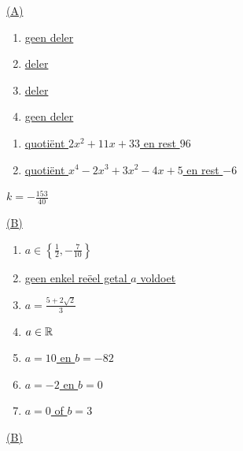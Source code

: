 \documentclass{ximera}
\begin{document}
\begin{oplossing} 
\hyperlink{oef3.2}{(A)}
\end{oplossing} 

\begin{oplossing} 
\begin{enumerate}
\item
\hyperlink{oef3.3}{geen deler}
\item
\hyperlink{oef3.3}{deler}
\item
\hyperlink{oef3.3}{deler}
\item
\hyperlink{oef3.3}{geen deler}
\end{enumerate}
\end{oplossing} 

\begin{oplossing} 
\begin{enumerate}
\item
\hyperlink{oef3.4}{quoti\"ent $2x^2+11x+33$ en rest $96$}
\item
\hyperlink{oef3.4}{quoti\"ent $x^4-2x^3+3x^2-4x+5$ en rest $-6$}
\end{enumerate}
\end{oplossing} 

\begin{oplossing} 
\hyperlink{oef3.5}{$k = - \frac{153}{40}$}
\end{oplossing} 

\begin{oplossing} 
\hyperlink{oef3.6}{(B)}
\end{oplossing} 

\begin{oplossing} 
\begin{enumerate}
\item
\hyperlink{oef3.7}{$a \in \left\{\frac{1}{2}, -\frac{7}{10}\right\}$}
\item
\hyperlink{oef3.7}{geen enkel re\"eel getal $a$ voldoet}
\item
\hyperlink{oef3.7}{$a = \frac{5+2\sqrt{2}}{3}$}
\item
\hyperlink{oef3.7}{$a \in \mathbb{R}$}
\item
\hyperlink{oef3.7}{$a = 10$ en $b = -82$}
\item
\hyperlink{oef3.7}{$a = -2$ en $b = 0$}
\item
\hyperlink{oef3.7}{$a = 0$ of $b = 3$}
\end{enumerate}
\end{oplossing} 

\begin{oplossing} 
\hyperlink{oef3.8}{(B)}
\end{oplossing} 
\end{document}
